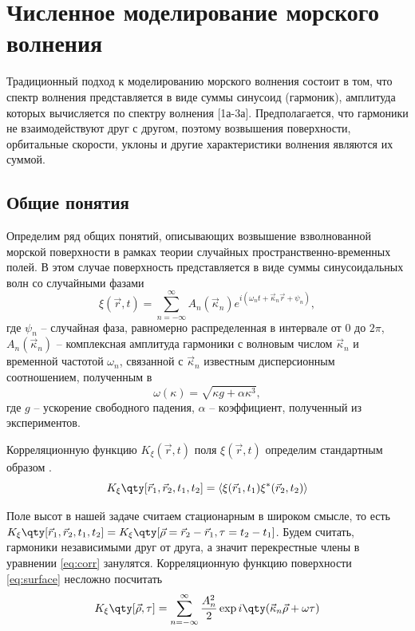 
\newcommand{\tK}{\widetilde K}
\section{Численное моделирование морского волнения}

Традиционный подход к моделированию морского волнения состоит в том, что спектр волнения представляется в виде суммы синусоид (гармоник), амплитуда которых вычисляется по спектру волнения [1а-3а]. Предполагается, что гармоники не взаимодействуют друг с другом, поэтому возвышения поверхности, орбитальные скорости, уклоны и другие характеристики волнения являются их суммой.

\subsection{Общие понятия}%
\label{sec:obshchie_poniatiia}
Определим ряд общих понятий, описывающих возвышение взволнованной морской поверхности в рамках теории случайных пространственно-временных полей. В этом случае поверхность представляется в виде суммы синусоидальных волн со случайными фазами 
\begin{equation}
    \label{eq:surface}
    \xi(\vec r,t) = \sum\limits_{n=-\infty}^{\infty} 
        A_n(\vec \kappa_n) e^{i(\omega_n t + \vec \kappa_n \vec r + \psi_n)},
\end{equation}
где $\psi_n$ -- случайная фаза,
равномерно распределенная в интервале от $0$ до  $2 \pi$, 
$A_n (\vec \kappa_n)$ -- комплексная амплитуда гармоники с волновым числом
$\vec \kappa_n$ и временной частотой  $\omega_n$, связанной с  $\vec \kappa_n$ известным
дисперсионным соотношением, полученным в \cite{cite:4}
\begin{equation}
    \omega(\kappa) = \sqrt{\kappa g + \alpha \kappa^3},
\end{equation}
где $g$ -- ускорение свободного падения,  $\alpha$ -- коэффициент, полученный
из экспериментов.


Корреляционную функцию $K_{\xi}(\vec r,t)$ поля  $\xi(\vec r, t) $ определим
стандартным образом \cite{cite:corr}.
 \begin{equation}
    \label{eq:corr}
    K_{\xi}\qty[\vec r_1, \vec r_2, t_1,t_2] = \mean{\xi(\vec r_1,t_1)\xi^*(\vec r_2,t_2)}
\end{equation}

Поле высот в нашей задаче считаем стационарным в широком смысле, то есть 
$K_{\xi}\qty[\vec r_{1},\vec r_{2},t_{1},t_{2}] = K_{\xi}\qty[\vec \rho = \vec
r_{2} - \vec r_1, \tau=t_{2}-t_{1}]$. Будем считать, гармоники
независимыми друг от друга, а значит перекрестные члены в уравнении
\eqref{eq:corr} занулятся.
Корреляционную функцию поверхности
\eqref{eq:surface} несложно посчитать
\begin{equation}
    \label{eq:surface_corr}
    K_{\xi}\qty[\vec \rho,\tau] = \sum\limits_{n=-\infty}^{\infty} 
    \frac{A_n^2}{2} 
    \exp{i \qty(\vec \kappa_n \vec \rho + \omega \tau)}
\end{equation}

